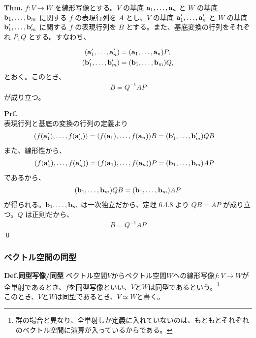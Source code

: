 \documentclass[a4paper,11pt]{jsarticle}
\numberwithin{equation}{section}
\begin{document}
\begin{itembox}[l]{\textbf{Thm.}}
  $f: V \to W$ を線形写像とする。$V$ の基底 $\vb{a}_1, \dots, \vb{a}_n$ と $W$ の基底 $\vb{b}_1, \dots, \vb{b}_m$ に関する $f$ の表現行列を $A$ とし、$V$ の基底 $\vb{a}_1', \dots, \vb{a}_n'$ と $W$ の基底 $\vb{b}_1', \dots, \vb{b}_m'$ に関する $f$ の表現行列を $B$ とする。また、基底変換の行列をそれぞれ $P, Q$ とする。すなわち、
  
  \begin{align}
      (\vb{a}_1', \dots, \vb{a}_n') &= (\vb{a}_1, \dots, \vb{a}_n) P, \\
      (\vb{b}_1', \dots, \vb{b}_m') &= (\vb{b}_1, \dots, \vb{b}_m) Q,
  \end{align}
  とおく。このとき、
  \begin{align}
  B = Q^{-1} A P
  \end{align}
  が成り立つ。
  \end{itembox}
  \textbf{Prf.}\\
  表現行列と基底の変換の行列の定義より
  \begin{align}
  (f(\vb{a}_1'), \dots, f(\vb{a}_n')) &= (f(\vb{a}_1), \dots, f(\vb{a}_n)) B = (\vb{b}_1', \dots, \vb{b}_m') QB
  \end{align}
  また、線形性から、
  \begin{align}
  (f(\vb{a}_1'), \dots, f(\vb{a}_n')) &= (f(\vb{a}_1), \dots, f(\vb{a}_n)) P = (\vb{b}_1, \dots, \vb{b}_m) AP
  \end{align}
  であるから、
  \begin{align}
  (\vb{b}_1, \dots, \vb{b}_m) QB = (\vb{b}_1, \dots, \vb{b}_m) AP
  \end{align}
  が得られる。$\vb{b}_1, \dots, \vb{b}_m$ は一次独立だから、定理 6.4.8 より $QB = AP$ が成り立つ。$Q$ は正則だから、
  \begin{align}
  B = Q^{-1} A P
  \end{align}
\qed

\subsubsection{ベクトル空間の同型}

\begin{itembox}[l]{\textbf{Def.同型写像/同型}}
  ベクトル空間$V$からベクトル空間$W$への線形写像$f:V \to W$が全単射であるとき、$f$を同型写像といい、$V$と$W$は同型であるという。\footnote{群の場合と異なり、全単射しか定義に入れていないのは、もともとそれぞれのベクトル空間に演算が入っているからである。}\\
  このとき、$V$と$W$は同型であるとき、$V \simeq W$と書く。
\end{itembox}
\end{document}
